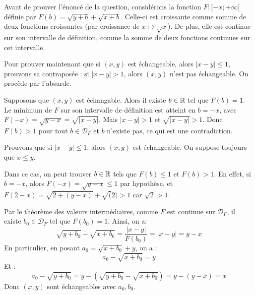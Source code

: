 \documentclass[]{../templates/homework}
\begin{document}
Avant de prouver l'énoncé de la question, considérons la fonction $F: [-x;+\infty[$ définie par $F(b) = \sqrt{y+b} + \sqrt{x+b}$. Celle-ci est croissante comme somme de deux fonctions croissantes (par croissance de $x\mapsto \sqrt x$). De plus, elle est continue sur son intervalle de définition, comme la somme de deux fonctions continues sur cet intervalle.

Pour prouver maintenant que si $(x,y)$ est échangeable, alors $|x-y| \leq 1$, prouvons sa contraposée : si $|x-y| > 1$, alors $(x,y)$ n'est pas échangeable. On procède par l'absurde.

Supposons que $(x,y)$ est échangable. Alors il existe $b\in\mathbb R$ tel que $F(b) = 1$. Le minimum de $F$ sur son intervalle de définition est atteint en $b=-x$, avec $F(-x) = \sqrt{y-x} = \sqrt{|x-y|}$. Mais $|x-y| > 1$ et $\sqrt{|x-y|} > 1$. Donc $F(b) > 1$ pour tout $b\in \mathcal D_F$ et $b$ n'existe pas, ce qui est une contradiction.

\subproblem
Prouvons que si $|x-y| \leq 1$, alors $(x,y)$ est échangeable. On suppose toujours que $x \leq y$.

Dans ce cas, on peut trouver $b\in\mathbb R$ tels que $F(b) \leq 1$ et $F(b) > 1$. En effet, si $b=-x$, alors $F(-x) = \sqrt{y-x} \leq 1$ par hypothèse, et $F(2-x) = \sqrt{2+(y-x)} + \sqrt(2) > 1$ car $\sqrt{2} > 1$.

Par le théorème des valeurs intermédiaires, comme $F$ est continue sur $\mathcal D_F$, il existe $b_0 \in \mathcal D_F$ tel que $F(b_0) = 1$. Ainsi, on a:
\begin{equation*}
	\sqrt{y+b_0} - \sqrt{x+b_0} = \frac{|x-y|}{F(b_0)} = |x-y| = y-x
\end{equation*}
En particulier, en posant $a_0 = \sqrt{x+b_0} + y$, on a : $$a_0 - \sqrt{x+b_0} = y$$
Et :$$a_0 - \sqrt{y+b_0} = y - (\sqrt{y+b_0} - \sqrt{x+b_0}) = y - (y-x) = x$$
Donc $(x,y)$ sont échangeables avec $a_0, b_0$.
\end{document}
